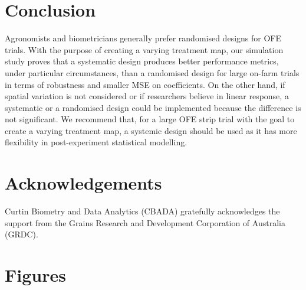 \documentclass[a4paper]{article} 	%
\begin{document}
\section{Conclusion}\label{Sec:Conclusion}

Agronomists and biometricians generally prefer randomised designs for OFE trials. With the purpose of creating a varying treatment map, our simulation study proves that a systematic design produces better performance metrics, under particular circumstances, than a randomised design for large on-farm trials in terms of robustness and smaller MSE on coefficients. On the other hand, if spatial variation is not considered or if researchers believe in linear response, a systematic or a randomised design could be implemented because the difference is not significant. We recommend that, for a large OFE strip trial with the goal to create a varying treatment map, a systemic design should be used as it has more flexibility in post-experiment statistical modelling. 


\section{Acknowledgements}

Curtin Biometry and Data Analytics (CBADA) gratefully acknowledges the support from the Grains Research and Development Corporation of Australia (GRDC).

\appendix

\section{Figures}
\end{document}
